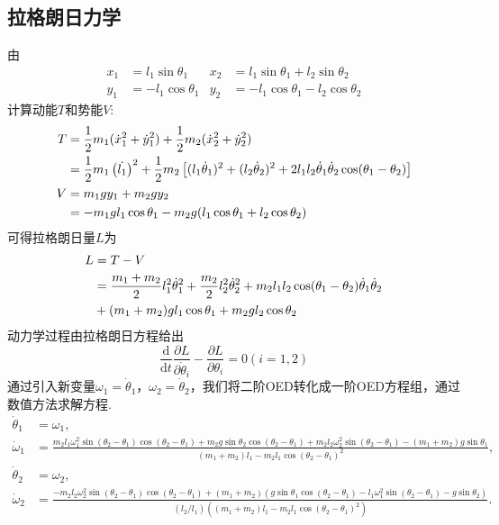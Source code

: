 \documentclass[12pt, a4paper, oneside]{article}
\begin{document}
\subsection{拉格朗日力学}
由
\begin{align*}
x_1 &= l_1 \sin\theta_1 &	x_2 &= l_1 \sin\theta_1 + l_2 \sin\theta_2 \\
y_1 &= -l_1 \cos\theta_1 &	y_2 &= -l_1 \cos\theta_1 - l_2 \cos\theta_2
\end{align*}
计算动能$T$和势能$V$:
\begin{align}
	T &= \frac{1}{2} m_1 ( \dot{x}_1^2 + \dot{y}_1^2 ) + \frac{1}{2} m_2 ( \dot{x}_2^2 + \dot{y}_2^2 ) \notag \\
	& = \frac{1}{2} m_1 \left(\dot{l_1} \right)^2 + \frac{1}{2} m_2 \left[ ( l_1 \dot{\theta}_1 )^2 + ( l_2 \dot{\theta}_2 )^2 + 2l_1l_2\dot{\theta}_1\dot{\theta}_2\cos(\theta_1 - \theta_2) \right] \\
	V &= m_1gy_1 + m_2gy_2 \notag \\
	& = - m_1gl_1 \cos\theta_1 - m_2g(l_1\cos\theta_1 + l_2\cos\theta_2)
\end{align}
可得拉格朗日量$L$为
\begin{align}
	L &= T -V  \notag \\
	&= \frac{m_1 + m_2}{2} l_1^2 \dot{\theta}_1^2 + \frac{m_2}{2} l_2^2 \dot{\theta}_2^2 + m_2l_1l_2\cos(\theta_1 - \theta_2)\dot{\theta}_1\dot{\theta}_2 \notag \\ 
	&+ (m_1+m_2)gl_1\cos\theta_1 + m_2gl_2\cos\theta_2
\end{align}
动力学过程由拉格朗日方程给出
\begin{equation}
	\frac{\mathrm{d}}{\mathrm{d}t} \frac{\partial L}{\partial \dot{\theta}_i} - \frac{\partial L}{\partial \theta_i} = 0 (i = 1,2)
\end{equation}
通过引入新变量$\omega_1 = \Dot{\theta}_1$，$\omega_2 = \Dot{\theta}_2$，我们将二阶OED转化成一阶OED方程组，通过数值方法求解方程.
\[
\begin{aligned}
\dot{\theta}_1 &= \omega_1, \\
\dot{\omega}_1 &= \frac{m_2 l_1 \omega_1^2 \sin(\theta_2 - \theta_1) \cos(\theta_2 - \theta_1) + m_2 g \sin\theta_2 \cos(\theta_2 - \theta_1) + m_2 l_2 \omega_2^2 \sin(\theta_2 - \theta_1) - (m_1 + m_2) g \sin\theta_1}{(m_1 + m_2) l_1 - m_2 l_1 \cos(\theta_2 - \theta_1)^2}, \\
\dot{\theta}_2 &= \omega_2, \\
\dot{\omega}_2 &= \frac{-m_2 l_2 \omega_2^2 \sin(\theta_2 - \theta_1) \cos(\theta_2 - \theta_1) + (m_1 + m_2) (g \sin\theta_1 \cos(\theta_2 - \theta_1) - l_1 \omega_1^2 \sin(\theta_2 - \theta_1) - g \sin\theta_2)}{(l_2 / l_1) ((m_1 + m_2) l_1 - m_2 l_1 \cos(\theta_2 - \theta_1)^2)}.
\end{aligned}
\]
\end{document}
